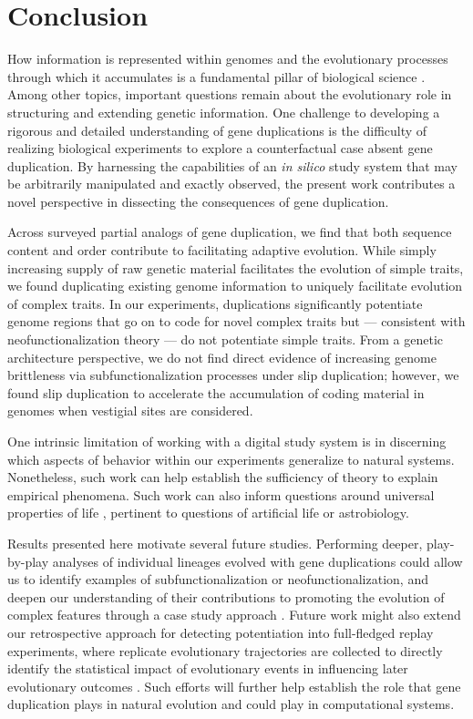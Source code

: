 \section{Conclusion} \label{sec:conclusion}

How information is represented within genomes and the evolutionary processes through which it accumulates is a fundamental pillar of biological science \citep{adami2024evolution}.
Among other topics, important questions remain about the evolutionary role in structuring and extending genetic information.
One challenge to developing a rigorous and detailed understanding of gene duplications is the difficulty of realizing biological experiments to explore a counterfactual case absent gene duplication.
By harnessing the capabilities of an \textit{in silico} study system that may be arbitrarily manipulated and exactly observed, the present work contributes a novel perspective in dissecting the consequences of gene duplication.

Across surveyed partial analogs of gene duplication, we find that both sequence content and order contribute to facilitating adaptive evolution.
While simply increasing supply of raw genetic material facilitates the evolution of simple traits, we found duplicating existing genome information to uniquely facilitate evolution of complex traits.
In our experiments, duplications significantly potentiate genome regions that go on to code for novel complex traits but --- consistent with neofunctionalization theory --- do not potentiate simple traits.
From a genetic architecture perspective, we do not find direct evidence of increasing genome brittleness via subfunctionalization processes under slip duplication; however, we found slip duplication to accelerate the accumulation of coding material in genomes when vestigial sites are considered.

One intrinsic limitation of working with a digital study system is in discerning which aspects of behavior within our experiments generalize to natural systems.
Nonetheless, such work can help establish the sufficiency of theory to explain empirical phenomena.
Such work can also inform questions around universal properties of life \citep{dorin2024what}, pertinent to questions of artificial life or astrobiology.

Results presented here motivate several future studies.
Performing deeper, play-by-play analyses of individual lineages evolved with gene duplications could allow us to identify examples of subfunctionalization or neofunctionalization, and deepen our understanding of  their contributions to promoting the evolution of complex features through a case study approach \citep{mcphee2018detailed}.
Future work might also extend our retrospective approach for detecting potentiation into full-fledged replay experiments, where replicate evolutionary trajectories are collected to directly identify the statistical impact of evolutionary events in influencing later evolutionary outcomes \citep{blount2018contingency,Ferguson2023}.
Such efforts will further help establish the role that gene duplication plays in natural evolution and could play in computational systems.

